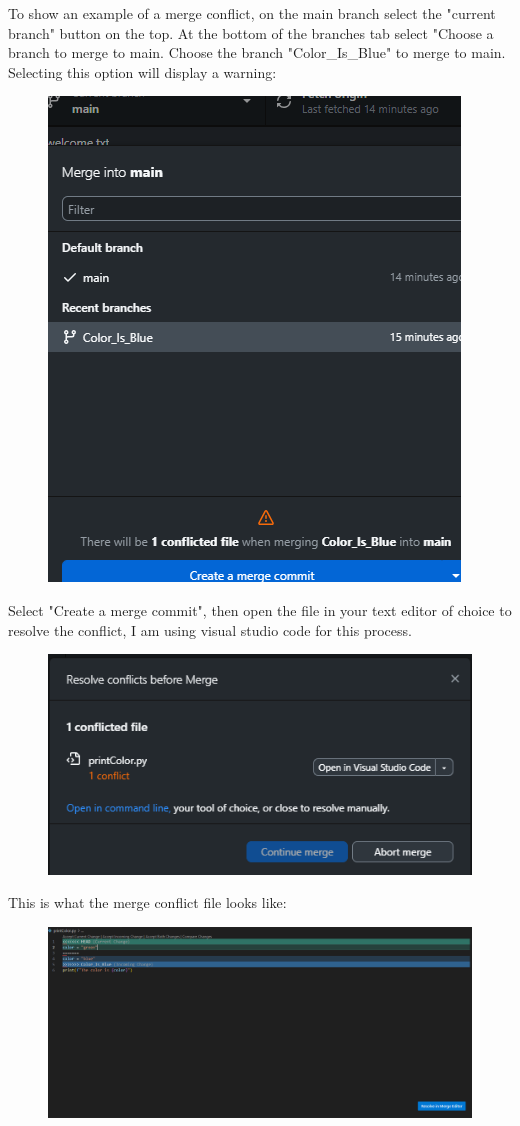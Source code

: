 \documentclass[10pt,twocolumn]{article}
\begin{document}
        To show an example of a merge conflict, on the main branch select the 
        "current branch" button on the top. At the bottom of the branches tab select "Choose a branch to merge to main. Choose the branch "Color\_Is\_Blue" to merge to main. Selecting this option will display a warning:
    \begin{figure}
        \centering
        \includegraphics[width=.5\linewidth]{MergeError.png}
    \end{figure}
    Select "Create a merge commit", then open the file in your text editor of choice to resolve the conflict, I am using visual studio code for this process.
    \begin{figure}
        \centering
        \includegraphics[width=0.5\linewidth]{MergeResolve.png}
    \end{figure}
    This is what the merge conflict file looks like:
    \begin{figure}
        \centering
        \includegraphics[width=1\linewidth]{MergeConflictFile.png}
    \end{figure}
\end{document}
